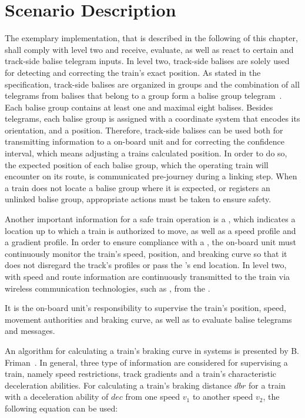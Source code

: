 \section{Scenario Description}
\label{sec:ImpScenarioDescription}
The exemplary implementation, that is described in the following of this chapter, shall comply with  level two and receive, evaluate, as well as react to certain  and track-side balise telegram inputs.
In  level two, track-side balises are solely used for detecting and correcting the train's exact position.
As stated in the  specification, track-side balises are organized in groups and the combination of all telegrams from balises that belong to a group form a balise group telegram~\cite{ETCS26}.
Each balise group contains at least one and maximal eight balises.
Besides telegrams, each balise group is assigned with a coordinate system that encodes its orientation, and a position.
Therefore, track-side balises can be used both for transmitting information to a on-board unit and for correcting the confidence interval, which means adjusting a trains calculated position.
In order to do so, the expected position of each balise group, which the operating train will encounter on its route, is communicated pre-journey during a linking step.
When a train does not locate a balise group where it is expected, or registers an unlinked balise group, appropriate actions must be taken to ensure safety.

Another important information for a safe train operation is a , which indicates a location up to which a train is authorized to move, as well as a speed profile and a gradient profile.
In order to ensure compliance with a , the on-board unit must continuously monitor the train's speed, position, and breaking curve so that it does not disregard the track's profiles or pass the 's end location.
In  level two,  with speed and route information are continuously transmitted to the train via wireless communication technologies, such as , from the .

It is the on-board unit's responsibility to supervise the train's position, speed, movement authorities and braking curve, as well as to evaluate balise telegrams and  messages.

An algorithm for calculating a train's braking curve in  systems is presented by B. Friman~\cite{CalculateBrakeCurveFriman}.
In general, three type of information are considered for supervising a train, namely speed restrictions, track gradients and a train's characteristic deceleration abilities.
For calculating a train's braking distance $dbr$ for a train with a deceleration ability of $dec$ from one speed $v_1$ to another speed $v_2$, the following equation can be used:

